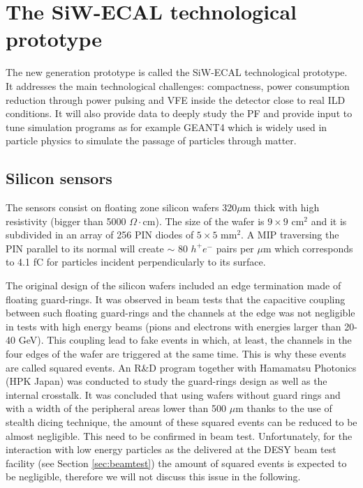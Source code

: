 \documentclass[final,3p,times,twocolumn]{elsarticle}
\begin{document}
\section{The SiW-ECAL technological prototype}


The new generation prototype is called the SiW-ECAL technological prototype. It addresses the main technological challenges: compactness,
power consumption reduction through power pulsing and VFE inside the detector close to real ILD conditions.
It will also provide data to deeply study the PF and provide input to tune simulation programs as for example
GEANT4\cite{Agostinelli:2002hh,Allison:2006ve,Allison:2016lfl} which is widely used
in particle physics to simulate the passage of particles through matter.

\subsection{Silicon sensors}
\label{sec:wafers}

The sensors consist on floating zone silicon wafers 320$\mu$m thick with high resistivity (bigger than 5000 $\Omega\cdot$cm).
The size of the wafer is $9\times9$ cm$^{2}$ and it is subdivided in an array of 256 PIN diodes of $5\times5$ mm$^{2}$.
A MIP traversing the PIN parallel to its normal will create $\sim$ 80 $h^{+}e^{-}$ pairs per $\mu$m which corresponds to 4.1 fC
for particles incident perpendicularly to its surface.

The original design of the silicon wafers included an edge termination made of floating guard-rings.
It was observed in beam tests \cite{Cornat:2015eoa,Cornat:2009zz} that the capacitive coupling between such floating guard-rings 
and the channels at the edge was not negligible in tests with high energy beams (pions and electrons with energies larger than 20-40 GeV).
This coupling lead to fake events in which, at least,
the channels in the four edges of the wafer are triggered at the same time. 
This is why these events are called squared events. 
An R\&D program together with Hamamatsu Photonics (HPK Japan) was conducted to study the guard-rings design 
as well as the internal crosstalk.
It was concluded that using wafers without guard rings and with a width of the peripheral areas lower than 
500 $\mu$m thanks to the use of stealth dicing technique, the amount of these squared events 
can be reduced to be almost negligible. This need to be confirmed in beam test.
Unfortunately, for the interaction with low energy particles as the delivered at the
DESY beam test facility (see Section \ref{sec:beamtest}) the
amount of squared events is expected to be negligible, therefore we will not discuss this issue in the following.
\end{document}

